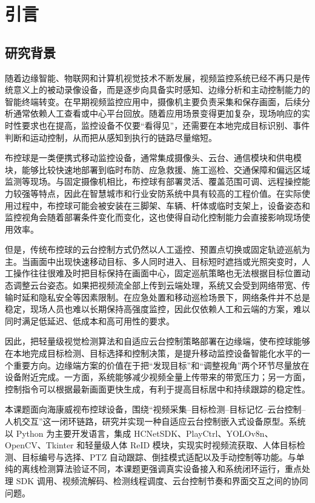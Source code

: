 \normalsize

\chapter{引言}

\section{研究背景}

随着边缘智能、物联网和计算机视觉技术不断发展，视频监控系统已经不再只是传统意义上的被动录像设备，而是逐步向具备实时感知、边缘分析和主动控制能力的智能终端转变。在早期视频监控应用中，摄像机主要负责采集和保存画面，后续分析通常依赖人工查看或中心平台回放。随着应用场景变得更加复杂，现场响应的实时性要求也在提高，监控设备不仅要“看得见”，还需要在本地完成目标识别、事件判断和运动控制，从而把从感知到执行的链路尽量缩短。

布控球是一类便携式移动监控设备，通常集成摄像头、云台、通信模块和供电模块，能够比较快速地部署到临时布防、应急救援、施工巡检、交通保障和偏远区域监测等现场。与固定摄像机相比，布控球有部署灵活、覆盖范围可调、远程操控能力较强等特点，因此在智慧城市和行业安防系统中具有较高的工程价值。在实际使用过程中，布控球可能会被安装在三脚架、车辆、杆体或临时支架上，设备姿态和监控视角会随着部署条件变化而变化，这也使得自动化控制能力会直接影响现场使用效率。

但是，传统布控球的云台控制方式仍然以人工遥控、预置点切换或固定轨迹巡航为主。当画面中出现快速移动目标、多人同时进入、目标短时遮挡或光照突变时，人工操作往往很难及时把目标保持在画面中心，固定巡航策略也无法根据目标位置动态调整云台姿态。如果把视频流全部上传到云端处理，系统又会受到网络带宽、传输时延和隐私安全等因素限制。在应急处置和移动巡检场景下，网络条件并不总是稳定，现场人员也难以长期保持高强度监控，因此仅依赖人工和云端的方案，难以同时满足低延迟、低成本和高可用性的要求。

因此，把轻量级视觉检测算法和自适应云台控制策略部署在边缘端，使布控球能够在本地完成目标检测、目标选择和控制决策，是提升移动监控设备智能化水平的一个重要方向。边缘端方案的价值在于把“发现目标”和“调整视角”两个环节尽量放在设备附近完成。一方面，系统能够减少视频全量上传带来的带宽压力；另一方面，控制指令可以根据最新画面更快生成，有利于提高目标居中和持续跟踪的稳定性。

本课题面向海康威视布控球设备，围绕“视频采集--目标检测--目标记忆--云台控制--人机交互”这一闭环链路，研究并实现一种自适应云台控制嵌入式设备原型。系统以 Python 为主要开发语言，集成 HCNetSDK、PlayCtrl、YOLOv8n、OpenCV、Tkinter 和轻量级人体 ReID 模块，实现实时视频流获取、人体目标检测、目标编号与选择、PTZ 自动跟踪、倒挂模式适配以及手动控制等功能。与单纯的离线检测算法验证不同，本课题更强调真实设备接入和系统闭环运行，重点处理 SDK 调用、视频流解码、检测线程调度、云台控制节奏和界面交互之间的协同问题。

